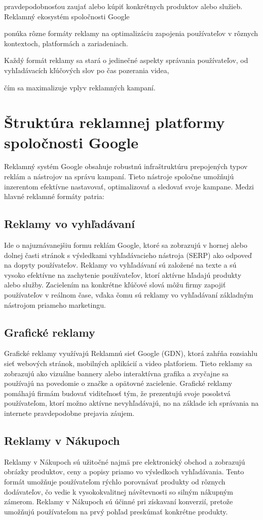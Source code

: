 \documentclass[10pt,slovak,a4paper]{article}
\begin{document}
pravdepodobnosťou zaujať alebo kúpiť konkrétnych produktov alebo služieb. Reklamný ekosystém spoločnosti Google  

ponúka rôzne formáty reklamy na optimalizáciu zapojenia používateľov v rôznych kontextoch, platformách a zariadeniach.  

Každý formát reklamy sa stará o jedinečné aspekty správania používateľov, od vyhľadávacích kľúčových slov po čas pozerania videa,  

čím sa maximalizuje vplyv reklamných kampaní. 

 

\section{Štruktúra reklamnej platformy spoločnosti Google}
Reklamný systém Google obsahuje robustnú infraštruktúru prepojených typov reklám a nástrojov na správu kampaní. 
Tieto nástroje spoločne umožňujú inzerentom efektívne nastavovať, optimalizovať a sledovať svoje kampane. 
Medzi hlavné reklamné formáty patria:\cite{9163447}\cite{6480027}

\subsection{Reklamy vo vyhľadávaní}
Ide o najuznávanejšiu formu reklám Google, ktoré sa zobrazujú v hornej alebo dolnej časti stránok s výsledkami 
vyhľadávacieho nástroja (SERP) ako odpoveď na dopyty používateľov. Reklamy vo vyhľadávaní sú založené na texte a 
sú vysoko efektívne na zachytenie používateľov, ktorí aktívne hľadajú produkty alebo služby. Zacielením na konkrétne 
kľúčové slová môžu firmy zapojiť používateľov v reálnom čase, vďaka čomu sú reklamy vo vyhľadávaní základným nástrojom 
priameho marketingu. 
\subsection{Grafické reklamy}
Grafické reklamy využívajú Reklamnú sieť Google (GDN), ktorá zahŕňa rozsiahlu sieť webových stránok, mobilných aplikácií 
a video platforiem. Tieto reklamy sa zobrazujú ako vizuálne bannery alebo interaktívna grafika a zvyčajne sa používajú 
na povedomie o značke a opätovné zacielenie. Grafické reklamy pomáhajú firmám budovať viditeľnosť tým, že prezentujú 
svoje posolstvá používateľom, ktorí možno aktívne nevyhľadávajú, no na základe ich správania na internete pravdepodobne 
prejavia záujem.

\subsection{Reklamy v Nákupoch}
Reklamy v Nákupoch sú užitočné najmä pre elektronický obchod a zobrazujú obrázky produktov, ceny a popisy priamo vo 
výsledkoch vyhľadávania. Tento formát umožňuje používateľom rýchlo porovnávať produkty od rôznych dodávateľov, čo vedie k 
vysokokvalitnej návštevnosti so silným nákupným zámerom. Reklamy v Nákupoch sú účinné pri získavaní konverzií, 
pretože umožňujú používateľom na prvý pohľad preskúmať konkrétne produkty.
\end{document}
